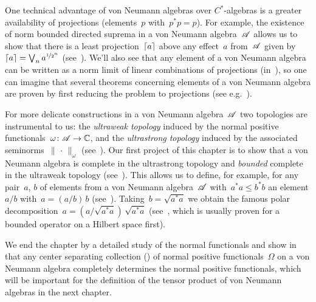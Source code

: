 \documentclass[a]{subfiles}
\begin{document}
\begin{parsec}
One technical advantage of von Neumann algebras
over $C^*$-algebras
is a greater availability of projections 
(elements~$p$ with~$p^*p=p$).
For example,
the existence of norm bounded directed suprema
in a von Neumann algebra~$\mathscr{A}$
allows us to show
that
there is a least projection~$\left\lceil a\right\rceil$
above any effect~$a$ from~$\mathscr{A}$
given by~$\left\lceil a\right\rceil=\bigvee_n a^{\nicefrac{1}{2}^n}$
(see~).
We'll also see that any element of a von Neumann algebra
can be written as a norm limit
of linear combinations of projections (in~),
so one can imagine that several theorems concerning elements
of a von Neumann algebra
are proven by first reducing the problem
to projections (see e.g.~).

For more delicate constructions
in a von Neumann algebra~$\mathscr{A}$
two topologies
are instrumental to us:
the \emph{ultraweak topology}
induced by the normal positive functionals~$\omega\colon\mathscr{A}\to\mathbb{C}$,
and the \emph{ultrastrong topology}
induced by the associated seminorms~$\|\,\cdot\,\|_\omega$
(see~).
Our first project of this chapter
is to show that a von Neumann algebra
is complete in the ultrastrong topology
and \emph{bounded} complete in the ultraweak topology
(see~).
This allows us to
define,
for example,
for any pair~$a$, $b$ of elements
from a von Neumann algebra~$\mathscr{A}$
with~$a^*a\leq b^*b$
an element $a/b$
with~$a=(a/b) \, b $
(see~).
Taking~$b=\sqrt{a^*a}$ we
obtain
the famous
polar decomposition~$a = (a/\sqrt{a^*a}) \, \sqrt{a^*a}$
(see~,
which is usually proven 
for a bounded operator on a Hilbert space first).

We end the chapter by a detailed
study of the normal functionals
and show 
in~
that any center separating collection ()
of normal positive functionals~$\Omega$
on a von Neumann algebra completely
determines the normal positive functionals,
which will be important for the definition of the tensor
product of von Neumann algebras in the next chapter.
\end{parsec}
\end{document}
